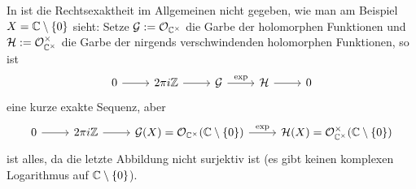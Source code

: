 \begin{beispiel}
    In  ist
    die Rechtsexaktheit im Allgemeinen nicht gegeben, wie man am Beispiel
    $X = \mathbb{C}\setminus\{0\}$ sieht: Setze $\mathcal{G} := \mathcal{O}_{\mathbb{C}^\times}$ die 
    Garbe der holomorphen Funktionen und 
    $\mathcal H := \mathcal{O}_{\mathbb{C}^\times}^\times$ die Garbe der nirgends verschwindenden
    holomorphen Funktionen, so ist
    \[\begin{tikzcd}
        0 \rar & 2\pi i \Z \rar & \G \rar{\exp} & 
        \cal H \rar & 0
    \end{tikzcd}\]
    eine kurze exakte Sequenz, aber
    \[\begin{tikzcd}
        0 \rar & 2\pi i \Z \rar & \G(X) = \O_{\C^\times}(\C\setminus\{0\}) 
        \rar{\exp} & 
        \cal H(X) =  \O_{\C^\times}^\times(\C\setminus\{0\})
    \end{tikzcd}\]
    ist alles, da die letzte Abbildung nicht surjektiv ist (es gibt keinen
    komplexen Logarithmus auf $\mathbb{C}\setminus\{0\}$).
\end{beispiel}


